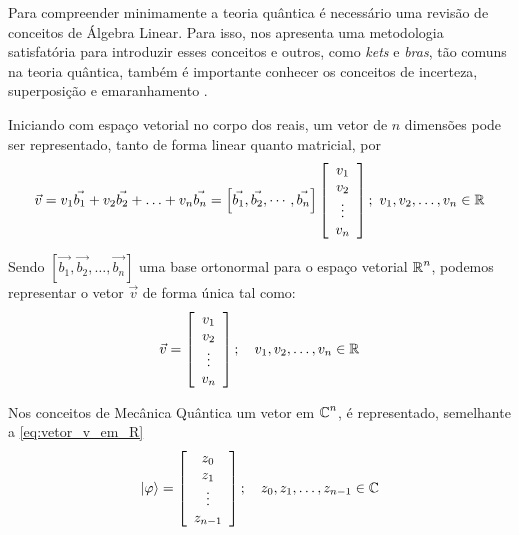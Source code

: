 Para compreender minimamente a teoria quântica é necessário uma revisão de conceitos de Álgebra Linear. Para isso, \textcite{Almeida2020} nos apresenta uma metodologia satisfatória para introduzir esses conceitos e outros, como \textit{kets} e \textit{bras}, tão comuns na teoria quântica, também é importante conhecer os conceitos de incerteza, superposição e emaranhamento \cite{hewitt2000fundamentos, mahon2000mecanica}. 

{\red Iniciando com espaço vetorial no corpo dos reais, um vetor de $n$ dimensões pode ser representado, tanto de forma linear quanto matricial, por}
$$
    \vec{v} = v_1\vec{b_1}+v_2\vec{b_2}+\ldots+v_n\vec{b_n}=\left[\vec{b_1}, \vec{b_2},\cdots, \vec{b_n}\right]\left[\begin{array}{c}
         v_1\\
         v_2\\ 
         \vdots\\
         v_n
    \end{array}\right];\ v_1, v_2,\ldots, v_n \in \operatorname{\mathbb{R}}
$$

Sendo $\left[\vec{b_1}, \vec{b_2},\dots, \vec{b_n}\right]$ uma base ortonormal para o espaço vetorial $\operatorname{\mathbb{R}}^n$, podemos representar o vetor $\vec{v}$ de forma única tal como:
\begin{equation}
    \label{eq:vetor_v_em_R}
    \vec{v}=\left[\begin{array}{c}
         v_1\\
         v_2\\ 
         \vdots\\
         v_n
    \end{array}\right];\quad v_1, v_2,\ldots, v_n \in \operatorname{\mathbb{R}}
\end{equation} 

Nos conceitos de Mecânica Quântica um vetor em $\operatorname{\mathbb{C}}^n$, é representado, semelhante a \autoref{eq:vetor_v_em_R}
$$
    \label{eq:vetor_em_C}
    \ket{\varphi} = \left[\begin{array}{c}
         z_0 \\
         z_1 \\
         \vdots \\
         z_{n-1}
    \end{array}\right];\quad z_0,z_1,\ldots, z_{n-1}\in\operatorname{\mathbb{C}}
$$

